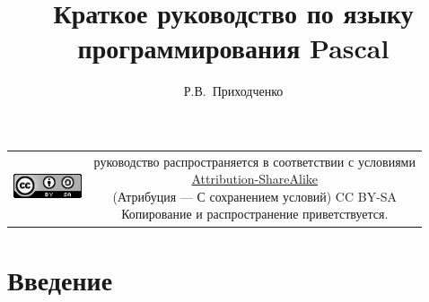 \documentclass[unicode, 12pt, a4paper,oneside,fleqn]{article}
\author{Р.В.~Приходченко}
\title{Краткое руководство по языку программирования Pascal}
\begin{document}


\maketitle
\tableofcontents


\begin{table}[ht]
  \begin{tabular}{cc}
    \includegraphics[width=2cm]{CC_BY-SA_88x31.png} &
    \shortstack{руководство распространяется в соответствии с
      условиями\\
      \href{http://creativecommons.org/licenses/by-sa/3.0/}{Attribution-ShareAlike} \\
      (Атрибуция — С сохранением условий) CC BY-SA \\
      Копирование и распространение приветствуется.}
  \end{tabular}
\end{table}

\section{Введение}
\end{document}
